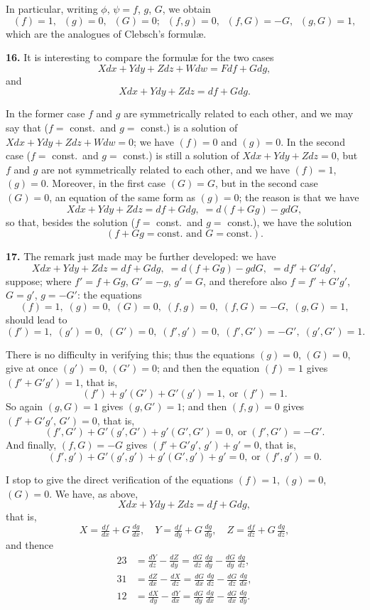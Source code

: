 \documentclass[11pt]{article}
\begin{document}
In particular, writing $\phi$, $\psi = f$, $g$, $G$, we obtain
\[ (f) = 1,\;\; (g) = 0,\;\; (G) = 0;\;\; (f,g) = 0,\;\; (f,G) = -G,\;\; (g,G) = 1, \]
which are the analogues of Clebsch's formul\ae.

\medskip
\textbf{16.} It is interesting to compare the formul\ae{} for the two cases
\[ Xdx + Ydy + Zdz + Wdw = Fdf + Gdg, \]
and
\[ Xdx + Ydy + Zdz = df + Gdg. \]

In the former case $f$ and $g$ are symmetrically related to each other, and we may say that ($f=$ const.\ and $g=$ const.) is a solution of $Xdx + Ydy + Zdz + Wdw = 0$; we have $(f) = 0$ and $(g) = 0$. In the second case ($f=$ const.\ and $g=$ const.) is still a solution of $Xdx + Ydy + Zdz = 0$, but $f$ and $g$ are not symmetrically related to each other, and we have $(f) = 1$, $(g) = 0$. Moreover, in the first case $(G) = G$, but in the second case $(G) = 0$, an equation of the same form as $(g) = 0$; the reason is that we have
\[ Xdx + Ydy + Zdz = df + Gdg,\;= d(f + Gg) - gdG, \]
so that, besides the solution ($f=$ const.\ and $g=$ const.), we have the solution
\[ (f + Gg = \text{const.\ and } G = \text{const.}). \]

\medskip
\textbf{17.} The remark just made may be further developed: we have
\[ Xdx + Ydy + Zdz = df + Gdg,\;= d(f + Gg) - gdG,\;= df' + G'dg', \]
suppose; where $f' = f + Gg$, $G' = -g$, $g' = G$, and therefore also $f = f' + G'g'$, $G = g'$, $g = -G'$: the equations
\[ (f) = 1,\;(g) = 0,\;(G) = 0,\;(f,g) = 0,\;(f,G) = -G,\;(g,G) = 1, \]
should lead to
\[ (f') = 1,\;(g') = 0,\;(G') = 0,\;(f',g') = 0,\;(f',G') = -G',\;(g',G') = 1. \]

There is no difficulty in verifying this; thus the equations $(g) = 0$, $(G) = 0$, give at once $(g') = 0$, $(G') = 0$; and then the equation $(f) = 1$ gives $(f' + G'g') = 1$, that is,
\[ (f') + g'(G') + G'(g') = 1,\;\text{or}\;(f') = 1. \]
So again $(g,G) = 1$ gives $(g,G') = 1$; and then $(f,g) = 0$ gives $(f' + G'g',\,G') = 0$, that is,
\[ (f',G') + G'(g',G') + g'(G',G') = 0,\;\text{or}\;(f',G') = -G'. \]
And finally, $(f,G) = -G$ gives $(f' + G'g',\,g') + g' = 0$, that is,
\[ (f',g') + G'(g',g') + g'(G',g') + g' = 0,\;\text{or}\;(f',g') = 0. \]

\medskip
I stop to give the direct verification of the equations $(f) = 1$, $(g) = 0$, $(G) = 0$. We have, as above,
\[ Xdx + Ydy + Zdz = df + Gdg, \]
that is,
\[ X = \tfrac{df}{dx} + G\,\tfrac{dg}{dx},\quad Y = \tfrac{df}{dy} + G\,\tfrac{dg}{dy},\quad Z = \tfrac{df}{dz} + G\,\tfrac{dg}{dz}, \]
and thence
\begin{align*}
23 &= \tfrac{dY}{dz} - \tfrac{dZ}{dy} = \tfrac{dG}{dz}\,\tfrac{dg}{dy} - \tfrac{dG}{dy}\,\tfrac{dg}{dz},\\
31 &= \tfrac{dZ}{dx} - \tfrac{dX}{dz} = \tfrac{dG}{dx}\,\tfrac{dg}{dz} - \tfrac{dG}{dz}\,\tfrac{dg}{dx},\\
12 &= \tfrac{dX}{dy} - \tfrac{dY}{dx} = \tfrac{dG}{dy}\,\tfrac{dg}{dx} - \tfrac{dG}{dx}\,\tfrac{dg}{dy}.
\end{align*}
\end{document}
